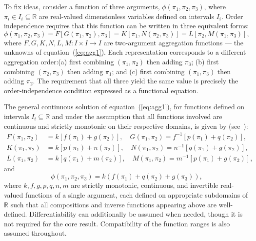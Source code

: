 To fix ideas, consider a function of three arguments, $\phi(\pi_1,\pi_2,\pi_3)$, where $\pi_i \in I_i \subseteq \mathbb{R}$ are real-valued dimensionless variables defined on intervals $I_i$. Order independence requires that this function can be written in three equivalent forms:
\begin{equation}
\boxed{\phi(\pi_1,\pi_2,\pi_3) = F[G(\pi_1,\pi_2),\pi_3]
= K[\pi_1,N(\pi_2,\pi_3)]
= L[\pi_2,M(\pi_1,\pi_3)],}
\label{eq:agg1}
\end{equation}
where $F, G, K, N, L, M : I \times I \to I$ are two-argument aggregation functions — the unknowns of equation~(\ref{eq:agg1}). Each representation corresponds to a different aggregation order:(a) first combining $(\pi_1,\pi_2)$ then adding $\pi_3$; (b) first combining $(\pi_2,\pi_3)$ then adding $\pi_1$; and (c) first combining $(\pi_1,\pi_3)$ then adding $\pi_2$. The requirement that all three yield the same value is precisely the order-independence condition expressed as a functional equation.

\begin{theorem}\label{thm:threevar_full}
The general continuous solution of equation~(\ref{eq:agg1}), for functions defined on intervals $I_i \subseteq \mathbb{R}$ and under the assumption that all functions involved are continuous and strictly monotonic on their respective domains, is given by (see~\cite{castillo2004functional}):
\begin{align}\label{eq:generalform}
F(\pi_1,\pi_2) &= k[f(\pi_1) + g(\pi_2)], \quad G(\pi_1,\pi_2) = f^{-1}[p(\pi_1) + q(\pi_2)],\nonumber\\
K(\pi_1,\pi_2) &= k[p(\pi_1) + n(\pi_2)], \quad N(\pi_1,\pi_2) = n^{-1}[q(\pi_1) + g(\pi_2)],\nonumber\\
L(\pi_1,\pi_2) &= k[q(\pi_1) + m(\pi_2)], \quad M(\pi_1,\pi_2) = m^{-1}[p(\pi_1) + g(\pi_2)],
\end{align}
and
\begin{equation}\label{genform}
\phi(\pi_1,\pi_2,\pi_3) =k\left(f(\pi_1) + q(\pi_2) + g(\pi_3)\right),
\end{equation}
where $k, f, g, p, q, n, m$ are strictly monotonic, continuous, and invertible real-valued functions of a single argument, each defined on appropriate subdomains of $\mathbb{R}$ such that all compositions and inverse functions appearing above are well-defined. Differentiability can additionally be assumed when needed, though it is not required for the core result. Compatibility of the function ranges is also assumed throughout.
\end{theorem}

